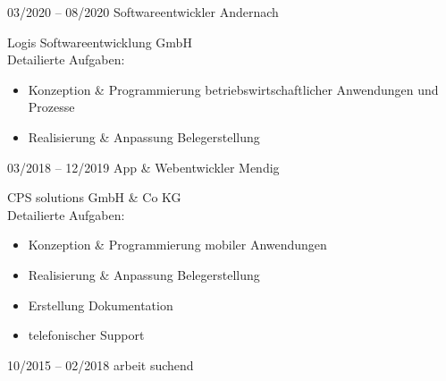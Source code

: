 \documentclass[a4paper]{friggeri-cv} %
\begin{document}
\begin{entrylist}
\entry
{03/2020 -- 08/2020}
{Softwareentwickler}
{Andernach}
{Logis Softwareentwicklung GmbH\\
	Detailierte Aufgaben:
	\begin{itemize}
		\item Konzeption \& Programmierung betriebswirtschaftlicher Anwendungen und Prozesse
		\item Realisierung \& Anpassung Belegerstellung
	\end{itemize}
}
\entry
{03/2018 -- 12/2019}
{App \& Webentwickler}
{Mendig}
{CPS solutions GmbH \& Co KG\\
	Detailierte Aufgaben:
	\begin{itemize}
		\item Konzeption \& Programmierung mobiler Anwendungen
		\item Realisierung \& Anpassung Belegerstellung
        	\item Erstellung Dokumentation
        	\item telefonischer Support
	\end{itemize}
}
\entry
{10/2015 -- 02/2018}
{arbeit suchend}
{}
{}


\end{entrylist}
\end{document}
